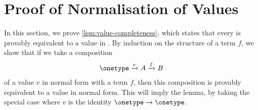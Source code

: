 
\section{Proof of Normalisation of Values}
\label{sec:proof-of-normalisation-of-values}
In this section, we prove \cref{lem:value-completeness}, which states that every  is provably equivalent to a value in . By induction on the structure of a term $f$, we show that if we take a composition
\begin{align*}
\onetype \xrightarrow v A \xrightarrow f B
\end{align*}
of a value $v$ in normal form with a term $f$, then this composition is provably equivalent to a value in normal form. This will imply the lemma, by taking the special case where $v$ is the identity $\onetype  \to \onetype $.

